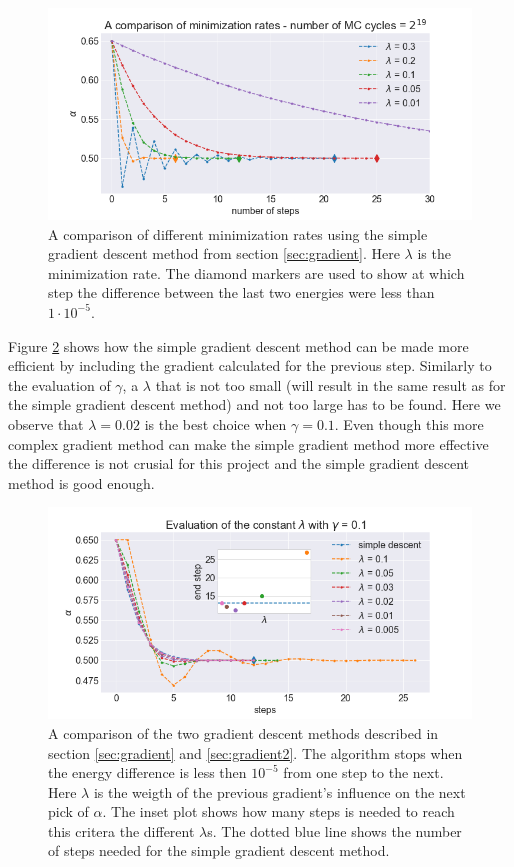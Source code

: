\begin{figure}[H]\caption{A comparison of different minimization rates using the simple gradient descent method from section \ref{sec:gradient}. Here $\lambda$ is the minimization rate. The diamond markers are used to show at which step the difference between the last two energies were less than $1\cdot 10^{-5}$.} \label{fig:gradient_descent_rates}
\center
\includegraphics[width=0.8\linewidth]{../Results/gradient_minimization_rate}
\end{figure}

Figure \ref{fig:gradient_descent_lambda} shows how the simple gradient descent method can be made more efficient by including the gradient calculated for the previous step. Similarly to the evaluation of $\gamma$, a $\lambda$ that is not too small (will result in the same result as for the simple gradient descent method) and not too large has to be found. Here we observe that $\lambda = 0.02$ is the best choice when $\gamma = 0.1$. Even though this more complex gradient method can make the simple gradient method more effective the difference is not crusial for this project and the simple gradient descent method is good enough.

\begin{figure}[H]\caption{A comparison of the two gradient descent methods described in section \ref{sec:gradient} and \ref{sec:gradient2}. The algorithm stops when the energy difference is less then $10^{-5}$ from one step to the next. Here $\lambda$ is the weigth of the previous gradient's influence on the next pick of $\alpha$. The inset plot shows how many steps is needed to reach this critera the different $\lambda$s. The dotted blue line shows the number of steps needed for the simple gradient descent method.}\label{fig:gradient_descent_lambda}
\center
\includegraphics[width=0.8\linewidth]{../Results/comparing_gradient_descents.png}
\end{figure}



